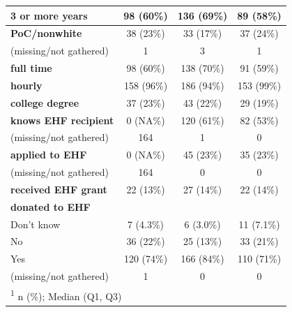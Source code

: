 \documentclass[
  11pt,
  oneside]{article}
\begin{document}
\begin{table}
\begin{tabular}[t]{l|c|c|c}
\hline
\hspace{1em}3 or more years & 98 (60\%) & 136 (69\%) & 89 (58\%)\\
\hline
\textbf{PoC/nonwhite} & 38 (23\%) & 33 (17\%) & 37 (24\%)\\
\hline
\hspace{1em}(missing/not gathered) & 1 & 3 & 1\\
\hline
\textbf{full time} & 98 (60\%) & 138 (70\%) & 91 (59\%)\\
\hline
\textbf{hourly} & 158 (96\%) & 186 (94\%) & 153 (99\%)\\
\hline
\textbf{college degree} & 37 (23\%) & 43 (22\%) & 29 (19\%)\\
\hline
\textbf{knows EHF recipient} & 0 (NA\%) & 120 (61\%) & 82 (53\%)\\
\hline
\hspace{1em}(missing/not gathered) & 164 & 1 & 0\\
\hline
\textbf{applied to EHF} & 0 (NA\%) & 45 (23\%) & 35 (23\%)\\
\hline
\hspace{1em}(missing/not gathered) & 164 & 0 & 0\\
\hline
\textbf{received EHF grant} & 22 (13\%) & 27 (14\%) & 22 (14\%)\\
\hline
\textbf{donated to EHF} &  &  & \\
\hline
\hspace{1em}Don’t know & 7 (4.3\%) & 6 (3.0\%) & 11 (7.1\%)\\
\hline
\hspace{1em}No & 36 (22\%) & 25 (13\%) & 33 (21\%)\\
\hline
\hspace{1em}Yes & 120 (74\%) & 166 (84\%) & 110 (71\%)\\
\hline
\hspace{1em}(missing/not gathered) & 1 & 0 & 0\\
\hline
\multicolumn{4}{l}{\rule{0pt}{1em}\textsuperscript{1} n (\%); Median (Q1, Q3)}\\
\end{tabular}
\end{table}
\end{document}
